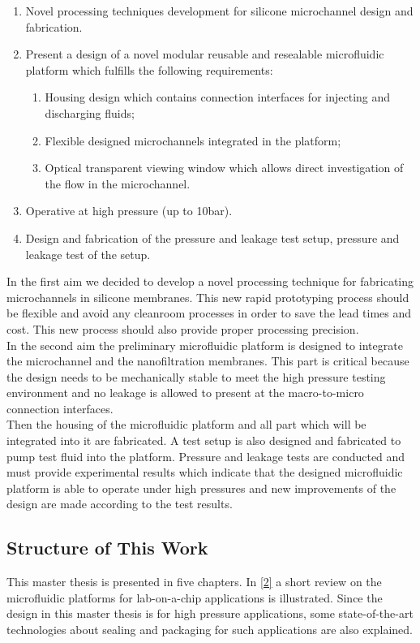 \begin{enumerate}
	\item Novel processing techniques development for silicone microchannel design and fabrication.
	\item Present a design of a novel modular reusable and resealable microfluidic platform which fulfills the following requirements:
	\begin{enumerate}
	\item Housing design which contains connection interfaces for injecting and discharging fluids;
	\item Flexible designed microchannels integrated in the platform;
	\item Optical transparent viewing window which allows direct investigation of the flow in the microchannel.
    \end{enumerate}
	\item Operative at high pressure (up to 10bar).
	\item Design and fabrication of the pressure and leakage test setup, pressure and leakage test of the setup.
\end{enumerate}

In the first aim we decided to develop a novel processing technique for fabricating microchannels in silicone membranes. This new rapid prototyping process should be flexible and avoid any cleanroom processes in order to save the lead times and cost. This new process should also provide proper processing precision.\\

In the second aim the preliminary microfluidic platform is designed to integrate the microchannel and the nanofiltration membranes. This part is critical because the design needs to be mechanically stable to meet the high pressure testing environment and no leakage is allowed to present at the macro-to-micro connection interfaces.\\

Then the housing of the microfluidic platform and all part which will be integrated into it are fabricated. A test setup is also designed and fabricated to pump test fluid into the platform. Pressure and leakage tests are conducted and must provide experimental results which indicate that the designed microfluidic platform is able to operate under high pressures and new improvements of the design are made according to the test results.

\subsection{Structure of This Work}
\label{1_2_2}
This master thesis is presented in five chapters. In \autoref{2} a short review on the microfluidic platforms for lab-on-a-chip applications is illustrated. Since the design in this master thesis is for high pressure applications, some state-of-the-art technologies about sealing and packaging for such applications are also explained.\\

